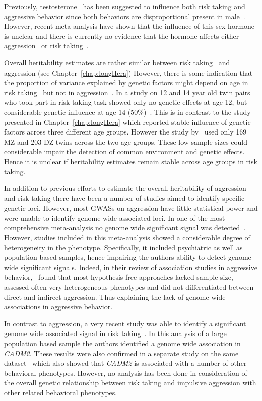 Previously, testosterone~\cite{Vermeersch2008} has been suggested to influence both risk taking and aggressive behavior since both behaviors are disproportional present in male~\cite{Byrnes1999}.
However, recent meta-analysis have shown that  the influence of this sex hormone is unclear and there is currently no evidence that the hormone affects either aggression~\cite{Archer2005a} or risk taking~\cite{Vermeersch2008}.

Overall heritability estimates are rather similar between risk taking~\cite{Anokhin2009} and aggression (see Chapter~\ref{chap:longHera})
However, there is some indication that the proportion of variance explained by genetic factors might depend on age in risk taking~\cite{Anokhin2009} but not in aggression~\cite{Porsch2016}.
In a study on 12 and 14 year old twin pairs who took part in risk taking task showed only no genetic effects at age 12, but considerable genetic influence at age 14 (50\%)~\cite{Anokhin2009}.
This is in contrast to the study presented in Chapter~\ref{chap:longHera} which reported stable influence of genetic factors across three different age groups.
However the study by~\citet{Anokhin2009} used only 169 MZ and 203 DZ twins across the two age groups.
These low sample sizes could considerable impair the detection of common environment and genetic effects. 
Hence it is unclear if heritability estimates remain stable across age groups in risk taking.

In addition to previous efforts to estimate the overall heritability of aggression and risk taking there have been a number of studies aimed to identify specific genetic loci.
However, most GWASs on aggression have little statistical power and were unable to identify genome wide associated loci.
In one of the most comprehensive meta-analysis no genome wide significant signal was detected~\citet{Vassos2014}.
However, studies included in this meta-analysis showed a considerable degree of heterogeneity in the phenotype.
Specifically, it included psychiatric as well as population based samples, hence impairing the authors ability to detect genome wide significant signals.
Indeed, in their review of association studies in aggressive behavior,~\citet{Fernandez-Castillo2016} found that most hypothesis free approaches lacked sample size, assessed often very heterogeneous phenotypes and did not differentiated between direct and indirect aggression. 
Thus explaining the lack of genome wide associations in aggressive behavior.

In contrast to aggression, a very recent study was able to identify a significant genome wide associated signal in risk taking~\cite{Day2016}. 
In this analysis of a large population based sample the authors identified a genome wide association in \textit{CADM2}.
These results were also confirmed in a separate study on the same dataset~\cite{Boutwell2017} which also showed that \textit{CADM2} is associated with a number of other behavioral phenotypes.
However, no analysis has been done in consideration of the overall genetic relationship between risk taking and impulsive aggression with other related behavioral phenotypes.

